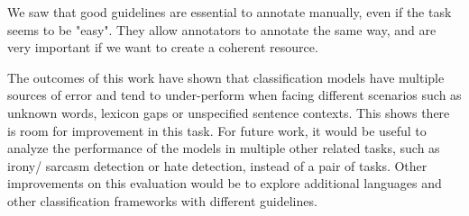 \documentclass[11pt,a4paper]{article}
\begin{document}
We saw that good guidelines are essential to annotate manually, even if the task seems to be "easy". They allow annotators to annotate the same way, and are very important if we want to create a coherent resource. 

The outcomes of this work have shown that classification models have multiple sources of error and tend to under-perform when facing different scenarios such as unknown words, lexicon gaps or unspecified sentence contexts. This shows there is room for improvement in this task. For future work, it would be useful to analyze the performance of the models in multiple other related tasks, such as irony/ sarcasm detection or hate detection, instead of a pair of tasks. Other improvements on this evaluation would be to explore additional languages and other classification frameworks with different guidelines.



\end{document}
